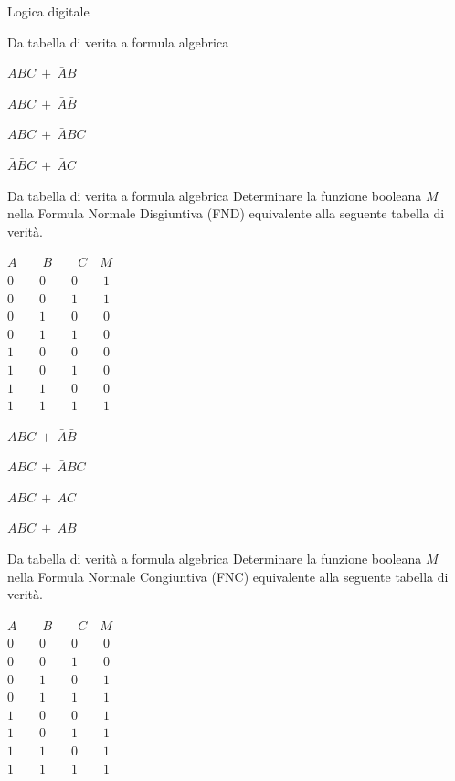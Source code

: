 \documentclass[11pt]{article}
\begin{document}
\begin{quiz}{Logica digitale}
\begin{multi}[points=1,shuffle=true]{Da tabella di verita a formula algebrica}
    \item* $ABC\ +\ \bar{A}B$
    \item $ABC\ +\ \bar{A}\bar{B}$
    \item $ABC\ +\ \bar{A}BC$
    \item $\bar{A}\bar{B}C\ +\ \bar{A}C$
\end{multi}

\begin{multi}[points=1,shuffle=true]{Da tabella di verita a formula algebrica}
    Determinare la funzione booleana $M$ nella Formula Normale Disgiuntiva (FND) equivalente alla seguente tabella di verit\`{a}.

    $A \qquad  B \qquad  C \quad M$ \\
    $0 \qquad 0 \qquad 0 \qquad 1$ \\
    $0 \qquad 0 \qquad 1 \qquad 1$ \\
    $0 \qquad 1 \qquad 0 \qquad 0$ \\
    $0 \qquad 1 \qquad 1 \qquad 0$ \\
    $1 \qquad 0 \qquad 0 \qquad 0$ \\
    $1 \qquad 0 \qquad 1 \qquad 0$ \\
    $1 \qquad 1 \qquad 0 \qquad 0$ \\
    $1 \qquad 1 \qquad 1 \qquad 1$ \\
    
    \item* $ABC\ +\ \bar{A}\bar{B}$
    \item $ABC\ +\ \bar{A}BC$
    \item $\bar{A}\bar{B}C\ +\ \bar{A}C$
    \item $\bar{A}BC\ +\ A\bar{B}$
\end{multi}

\begin{multi}[points=1,shuffle=true]{Da tabella di verità a formula algebrica}
    Determinare la funzione booleana $M$ nella Formula Normale Congiuntiva (FNC) equivalente alla seguente tabella di verit\`{a}.

    $A \qquad  B \qquad  C \quad M$ \\
    $0 \qquad 0 \qquad 0 \qquad 0$ \\
    $0 \qquad 0 \qquad 1 \qquad 0$ \\
    $0 \qquad 1 \qquad 0 \qquad 1$ \\
    $0 \qquad 1 \qquad 1 \qquad 1$ \\
    $1 \qquad 0 \qquad 0 \qquad 1$ \\
    $1 \qquad 0 \qquad 1 \qquad 1$ \\
    $1 \qquad 1 \qquad 0 \qquad 1$ \\
    $1 \qquad 1 \qquad 1 \qquad 1$ \\
    

\end{multi}
\end{quiz}
\end{document}

